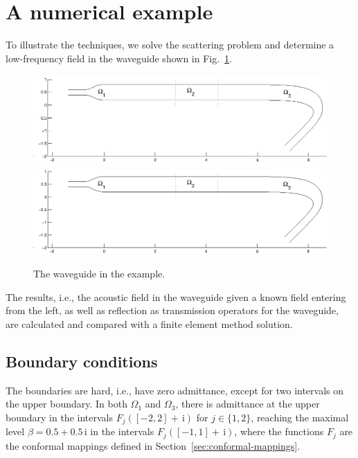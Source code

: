 \documentclass[a4paper,11pt]{article}
\renewcommand{\i}{\,\mathrm{i}}
\begin{document}
\section{A numerical example}
\label{sec:numerical-example}
To illustrate the techniques, we solve the scattering problem and
determine a low-frequency field in the waveguide shown in
Fig.~\ref{fig:exwg}.
\begin{figure}[htb]
  \centering \ifpdf
  \includegraphics[width=\textwidth]{waveguide.jpg}
  \else
  \includegraphics[width=\textwidth]{waveguide.eps}
  \fi
  \caption{The waveguide in the example.}
  \label{fig:exwg}
\end{figure}
The results, i.e., the acoustic field in the waveguide given a known
field entering from the left, as well as reflection as transmission
operators for the waveguide, are calculated and compared with a finite
element method solution.

\subsection{Boundary conditions}
\label{sec:boundary-conditions}



The boundaries are hard, i.e., have zero admittance, except for two
intervals on the upper boundary. In both $\Omega_1$ and $\Omega_3$,
there is admittance at the upper boundary in the intervals
$F_j([-2,2]+\i)$ for $j\in\{1,2\}$, reaching the maximal level
$\beta=0.5+0.5\i$ in the intervals $F_j([-1,1]+\i)$, where the
functions $F_j$ are the conformal mappings defined in
Section~\ref{sec:conformal-mappings}. 
\end{document}
